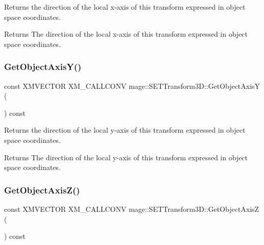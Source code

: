 Returns the direction of the local x-\/axis of this transform expressed in object space coordinates.

\begin{DoxyReturn}{Returns}
The direction of the local x-\/axis of this transform expressed in object space coordinates. 
\end{DoxyReturn}
\mbox{\label{classmage_1_1_s_e_t_transform3_d_a1bb19751799ff543da8237aa883ce9da}} 
\subsubsection{\texorpdfstring{Get\+Object\+Axis\+Y()}{GetObjectAxisY()}}
{\footnotesize\ttfamily const X\+M\+V\+E\+C\+T\+OR X\+M\+\_\+\+C\+A\+L\+L\+C\+O\+NV mage\+::\+S\+E\+T\+Transform3\+D\+::\+Get\+Object\+AxisY (\begin{DoxyParamCaption}{ }\end{DoxyParamCaption}) const\hspace{0.3cm}{\ttfamily [noexcept]}}

Returns the direction of the local y-\/axis of this transform expressed in object space coordinates.

\begin{DoxyReturn}{Returns}
The direction of the local y-\/axis of this transform expressed in object space coordinates. 
\end{DoxyReturn}
\mbox{\label{classmage_1_1_s_e_t_transform3_d_a90bb9294cdded695324e9ac8dc889a66}} 
\subsubsection{\texorpdfstring{Get\+Object\+Axis\+Z()}{GetObjectAxisZ()}}
{\footnotesize\ttfamily const X\+M\+V\+E\+C\+T\+OR X\+M\+\_\+\+C\+A\+L\+L\+C\+O\+NV mage\+::\+S\+E\+T\+Transform3\+D\+::\+Get\+Object\+AxisZ (\begin{DoxyParamCaption}{ }\end{DoxyParamCaption}) const\hspace{0.3cm}{\ttfamily [noexcept]}}

